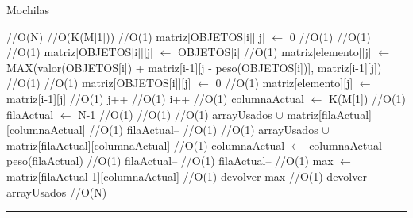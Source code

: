 \begin{algorithm}[H]
\caption{Mochilas}
\begin{algorithmic}[1]
 \hfill //O(N)
 \hfill //O(K(M[1]))
 \hfill //O(1)
\state matriz[OBJETOS[i]][j] $\gets$ 0 \hfill //O(1)
\endif
{} \hfill //O(1)
 \hfill //O(1)
\state matriz[OBJETOS[i]][j] $\gets$ OBJETOS[i] \hfill //O(1)
\Else
\state matriz[elemento][j] $\gets$ MAX(valor(OBJETOS[i]) +  \state
matriz[i-1][j - peso(OBJETOS[i])], matriz[i-1][j]) \hfill //O(1)
\endif
\Else
{} \hfill //O(1)
\state matriz[OBJETOS[i]][j] $\gets$ 0 \hfill //O(1)
\Else
\state matriz[elemento][j] $\gets$ matriz[i-1][j] \hfill //O(1)
\endif
\endif
\state j++  \hfill //O(1)
\endwhile
\state i++  \hfill //O(1)
\endwhile
\state columnaActual $\gets$ K(M[1]) \hfill //O(1)
\state filaActual $\gets$ N-1 \hfill //O(1)
 \hfill //O(1)
\hfill //O(1)
\state arrayUsados $\cup$ matriz[filaActual][columnaActual] \hfill //O(1)
\endif
\state filaActual-- \hfill //O(1)
\endif
{}\hfill //O(1)
\state arrayUsados $\cup$ matriz[filaActual][columnaActual] \hfill //O(1)
\state columnaActual $\gets$ columnaActual - peso(filaActual)  \hfill //O(1)
\state filaActual-- \hfill //O(1)
\Else
\state filaActual-- \hfill //O(1)
\endif
\endwhile
\state max $\gets$ matriz[filaActual-1][columnaActual] \hfill //O(1)
\state devolver max  \hfill //O(1)
\state devolver arrayUsados \hfill //O(N)
\EndFunction 
\end{algorithmic}
\hrule
{}
\end{algorithm}


